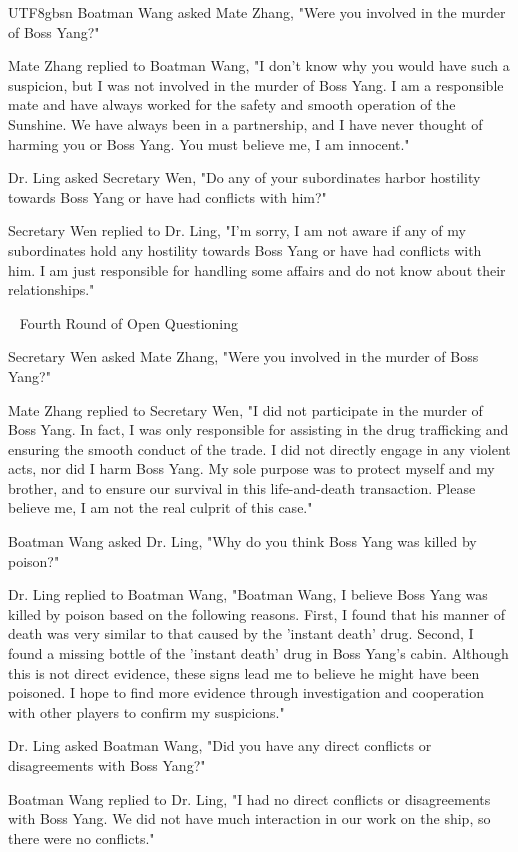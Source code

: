 \documentclass[11pt]{article}
\begin{document}
{\begin{CJK}{UTF8}{gbsn}
Boatman Wang asked Mate Zhang, "Were you involved in the murder of Boss Yang?"

Mate Zhang replied to Boatman Wang, "I don't know why you would have such a suspicion, but I was not involved in the murder of Boss Yang. I am a responsible mate and have always worked for the safety and smooth operation of the Sunshine. We have always been in a partnership, and I have never thought of harming you or Boss Yang. You must believe me, I am innocent."

Dr. Ling asked Secretary Wen, "Do any of your subordinates harbor hostility towards Boss Yang or have had conflicts with him?"

Secretary Wen replied to Dr. Ling, "I'm sorry, I am not aware if any of my subordinates hold any hostility towards Boss Yang or have had conflicts with him. I am just responsible for handling some affairs and do not know about their relationships."

\ \raisedrule[.5ex]{1pt} Fourth Round of Open Questioning \raisedrule[.5ex]{1pt} \ 

Secretary Wen asked Mate Zhang, "Were you involved in the murder of Boss Yang?"

Mate Zhang replied to Secretary Wen, "I did not participate in the murder of Boss Yang. In fact, I was only responsible for assisting in the drug trafficking and ensuring the smooth conduct of the trade. I did not directly engage in any violent acts, nor did I harm Boss Yang. My sole purpose was to protect myself and my brother, and to ensure our survival in this life-and-death transaction. Please believe me, I am not the real culprit of this case."

Boatman Wang asked Dr. Ling, "Why do you think Boss Yang was killed by poison?"

Dr. Ling replied to Boatman Wang, "Boatman Wang, I believe Boss Yang was killed by poison based on the following reasons. First, I found that his manner of death was very similar to that caused by the 'instant death' drug. Second, I found a missing bottle of the 'instant death' drug in Boss Yang's cabin. Although this is not direct evidence, these signs lead me to believe he might have been poisoned. I hope to find more evidence through investigation and cooperation with other players to confirm my suspicions."

Dr. Ling asked Boatman Wang, "Did you have any direct conflicts or disagreements with Boss Yang?"

Boatman Wang replied to Dr. Ling, "I had no direct conflicts or disagreements with Boss Yang. We did not have much interaction in our work on the ship, so there were no conflicts."


\end{CJK}}
\end{document}
